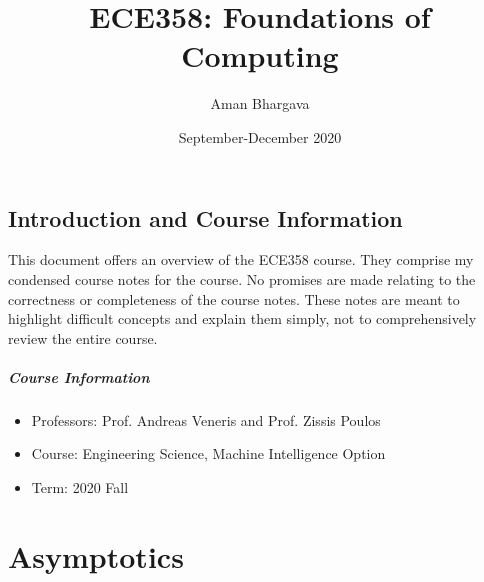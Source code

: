 \documentclass[a4paper,12pt]{report}
\begin{document}
\title{ECE358: Foundations of Computing}
\author{Aman Bhargava}
\date{September-December 2020}
\maketitle

\tableofcontents

\section{Introduction and Course Information}

This document offers an overview of the ECE358 course. They comprise my condensed course notes for the course. No promises are made relating to the correctness or completeness of the course notes. These notes are meant to highlight difficult concepts and explain them simply, not to comprehensively review the entire course.

\paragraph{Course Information}
\begin{itemize}
\item Professors: Prof. Andreas Veneris and Prof. Zissis Poulos
\item Course: Engineering Science, Machine Intelligence Option
\item Term: 2020 Fall
\end{itemize}




\chapter{Asymptotics}
\end{document}
